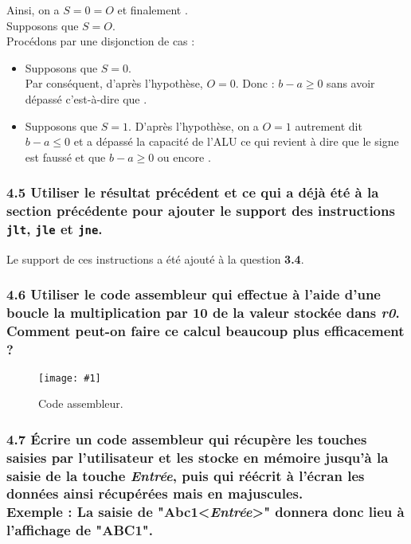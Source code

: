 \documentclass[twoside, 12pt, a4paper]{article}
\newcommand{\cf}[3]{
    \begin{figure}[!hbt]
        \centering
        \texttt{[image: \#1]}
    \caption{#3}\label{Fig:#1}
    \end{figure}
}
\newcommand{\hcf}[2]{\cf{#1}{.75}{#2}}
\begin{document}
            Ainsi, on a $S = 0 = O$ et finalement . \\

        \framebox[1cm][c]{\impliedby} Supposons que $S = O$. \\
        Procédons par une disjonction de cas :
        \begin{itemize}
            \item Supposons que $S = 0$. \\
            Par conséquent, d'après l'hypothèse, $O = 0$.
            Donc : $b-a \geq 0$ sans avoir dépassé c'est-à-dire que .
            \item Supposons que $S = 1$.
            D'après l'hypothèse, on a $O = 1$ autrement dit $b-a \leq 0$ et a dépassé la capacité de l'ALU ce qui revient à dire que le signe est faussé et que $b-a \geq 0$ ou encore .
        \end{itemize}
        
        
        \subsubsection*{\textbf{4.5} Utiliser le résultat précédent et ce qui a déjà été à la section précédente pour ajouter le support des instructions \texttt{jlt}, \texttt{jle} et \texttt{jne}.}

Le support de ces instructions a été ajouté à la question \textbf{3.4}.
        
        \subsubsection*{\textbf{4.6} Utiliser le code assembleur qui effectue à l'aide d'une boucle la multiplication par 10 de la valeur stockée dans \textit{r0}.\\
        Comment peut-on faire ce calcul beaucoup plus efficacement ?}


\hcf{150.png}{Code assembleur.}
        
        \subsubsection*{\textbf{4.7} Écrire un code assembleur qui récupère les touches saisies par l'utilisateur et les stocke en mémoire jusqu'à la saisie de la touche \textit{Entrée}, puis qui réécrit à l'écran les données ainsi récupérées mais en majuscules.\\
        \textbf{Exemple : } La saisie de "Abc1<\textit{Entrée}>" donnera donc lieu à l'affichage de "ABC1".}
\end{document}
